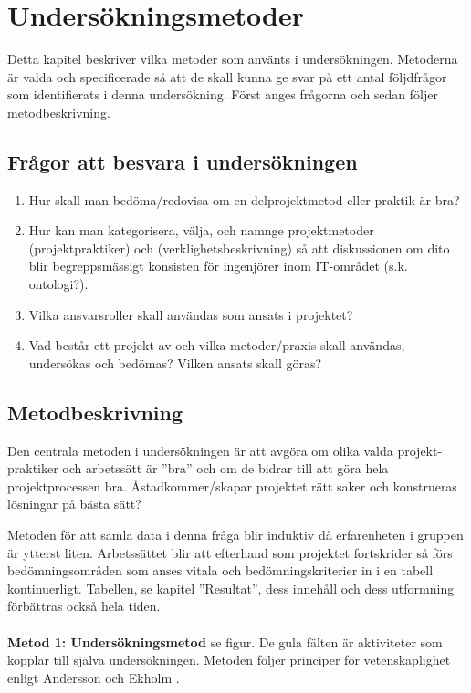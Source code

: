 \documentclass[conference,a4paper]{IEEEtran}
\begin{document}
\section{Undersökningsmetoder} \label{sec:under}
Detta kapitel beskriver vilka metoder som använts i undersökningen. Metoderna är valda och specificerade så att de skall kunna ge svar på ett antal följdfrågor som identifierats i denna undersökning. Först anges frågorna och sedan följer metodbeskrivning.
\subsection{Frågor att besvara i undersökningen}

\begin{enumerate}

\item Hur skall man bedöma/redovisa om en delprojektmetod eller praktik är bra?

\item Hur kan man kategorisera, välja, och namnge projektmetoder (projektpraktiker) och (verklighetsbeskrivning) så att diskussionen om dito blir begreppsmässigt konsisten för ingenjörer inom IT-området (s.k. ontologi?).

\item Vilka ansvarsroller skall användas som ansats i projektet?

\item Vad består ett projekt av och vilka metoder/praxis skall användas, undersökas och bedömas? Vilken ansats skall göras?

\end{enumerate}

\subsection{Metodbeskrivning}
Den centrala metoden i undersökningen är att avgöra om olika valda projekt-praktiker och arbetssätt är ”bra” och om de bidrar till att göra hela projektprocessen bra. Åstadkommer/skapar projektet rätt saker och konstrueras lösningar på bästa sätt?

Metoden för att samla data i denna fråga blir induktiv då erfarenheten i gruppen är ytterst liten. Arbetssättet blir att efterhand som projektet fortskrider så förs bedömningsområden som anses vitala och bedömningskriterier in i en tabell kontinuerligt. Tabellen, se kapitel ”Resultat”, dess innehåll och dess utformning förbättras också hela tiden.\\
\\
\textbf{Metod 1: Undersökningsmetod} se figur. De gula fälten är aktiviteter som kopplar till själva undersökningen. Metoden följer principer för vetenskaplighet enligt Andersson och Ekholm \cite{Andersson02}.
\end{document}
